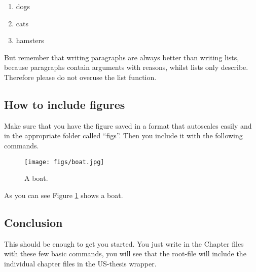 \begin{enumerate}
	\item dogs
	\item cats
	\item hamsters
\end{enumerate}

But remember that writing paragraphs are always better than writing lists, because paragraphs contain arguments with reasons, whilst lists only describe. Therefore please do not overuse the list function.

\subsection{How to include figures}

Make sure that you have the figure saved in a format that autoscales easily and in the appropriate folder called ``figs''. Then you include it with the following commands.

\begin{figure}[h]
  \texttt{[image: figs/boat.jpg]}
  \caption{A boat.}
  \label{fig:boat1}
\end{figure}

As you can see Figure \ref{fig:boat1} shows a boat.

\subsection{Conclusion}

This should be enough to get you started. You just write in the Chapter files with these few basic commands, you will see that the root-file will include the individual chapter files in the US-thesis wrapper.
